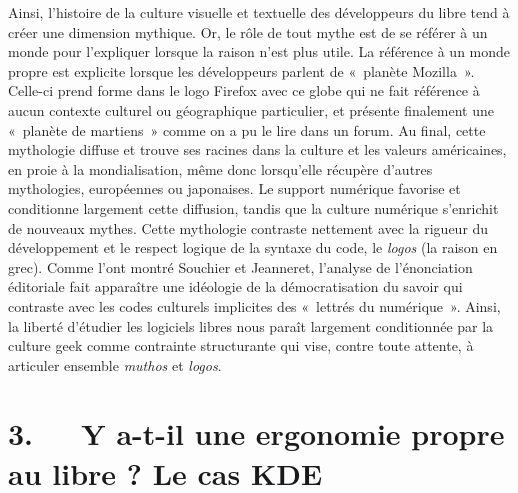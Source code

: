 \documentclass{FramateX}
\begin{document}
\begin{refsection}
Ainsi, l'histoire de la culture visuelle et textuelle des développeurs
du libre tend à créer une dimension mythique. Or, le rôle de tout mythe
est de se référer à un monde pour l'expliquer lorsque la raison n'est
plus utile. La référence à un monde propre est explicite lorsque les
développeurs parlent de «~planète Mozilla~». Celle-ci prend forme dans
le logo Firefox avec ce globe qui ne fait référence à aucun contexte
culturel ou géographique particulier, et présente finalement une
«~planète de martiens~» comme on a pu le lire dans un forum. Au final,
cette mythologie diffuse et trouve ses racines dans la culture et les
valeurs américaines, en proie à la mondialisation, même donc
lorsqu'elle récupère d'autres mythologies, européennes ou japonaises.
Le support numérique favorise et conditionne largement cette diffusion,
tandis que la culture numérique s'enrichit de nouveaux mythes. Cette
mythologie contraste nettement avec la rigueur du développement et le
respect logique de la syntaxe du code, le \textit{logos} (la raison en
grec). Comme l'ont montré Souchier et Jeanneret, l'analyse de
l'énonciation éditoriale fait apparaître une idéologie de la
démocratisation du savoir qui contraste avec les codes culturels
implicites des «~lettrés du numérique~». Ainsi, la liberté d'étudier
les logiciels libres nous paraît largement conditionnée par la culture
geek comme contrainte structurante qui vise, contre toute attente, à
articuler ensemble \textit{muthos }et \textit{logos}. 

\section*{3.~~~Y a-t-il une ergonomie propre au libre ? Le cas KDE}
{}



\end{refsection}
\end{document}

